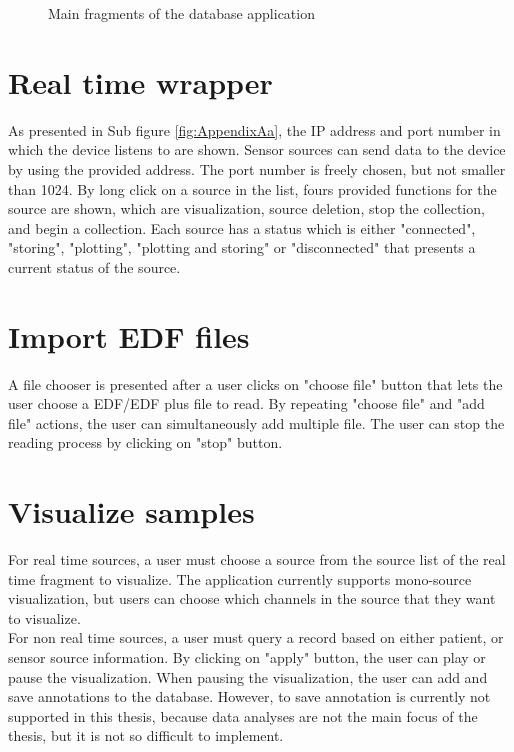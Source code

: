 \begin{figure}
        \caption{Main fragments of the database application}
        \label{fig:AppendixA}
\end{figure}
\section{Real time wrapper}
As presented in Sub figure \ref{fig:AppendixAa}, the IP address and port number in which the device listens to are shown. Sensor sources can send data to the device by using the provided address. The port number is freely chosen, but not smaller than 1024. By long click on a source in the list, fours provided functions for the source are shown, which are visualization, source deletion, stop the collection, and begin a collection. Each source has a status which is either "connected", "storing", "plotting", "plotting and storing" or "disconnected" that presents a current status of the source. 
\section{Import EDF files}
A file chooser is presented after a user clicks on "choose file" button that lets the user choose a EDF/EDF plus file to read. By repeating "choose file" and "add file" actions, the user can simultaneously add multiple file. The user can stop the reading process by clicking on "stop" button.
\section{Visualize samples}
For real time sources, a user must choose a source from the source list of the real time fragment to visualize. The application currently supports mono-source visualization, but users can choose which channels in the source that they want to visualize.\\
For non real time sources, a user must query a record based on either patient, or sensor source information. By clicking on "apply" button, the user can play or pause the visualization. When pausing the visualization, the user can add and save annotations to the database. However, to save annotation is currently not supported in this thesis, because data analyses are not the main focus of the thesis, but it is not so difficult to implement. 
